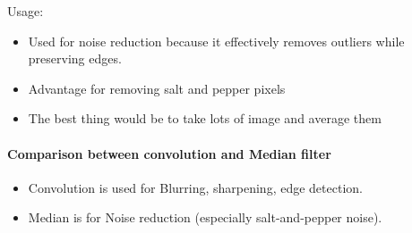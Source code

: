 Usage:
\begin{itemize}
    \item Used for noise reduction
          because it effectively removes outliers while preserving edges.
    \item Advantage for removing salt and pepper pixels
    \item The best thing would be to take lots of image and average them
\end{itemize}

\paragraph*{Comparison between convolution and Median filter}
\begin{itemize}
    \item Convolution is used for
          Blurring, sharpening, edge detection.
    \item Median is for
          Noise reduction (especially salt-and-pepper noise).
\end{itemize}

